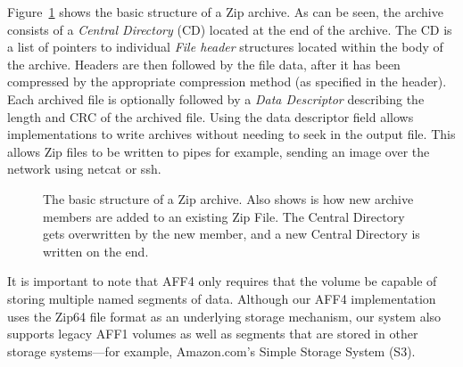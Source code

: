 \documentclass[10pt, conference]{IEEEtran}
\begin{document}
Figure~\ref{zip_structure} shows the basic structure of a Zip
archive. As can be seen, the archive consists of a {\em Central Directory} (CD)
located at the end of the archive. The CD is a list of pointers to
individual {\em File header} structures located within the body of the
archive. Headers are then followed by the file data, after it has been
compressed by the appropriate compression method (as specified in the
header). Each archived file is optionally followed by a {\em Data
Descriptor} describing the length and CRC of the archived file. Using
the data descriptor field allows implementations to write archives
without needing to seek in the output file. This allows Zip files to
be written to pipes for example, sending an image over the network
using netcat or ssh.

\begin{figure}[tbp]
  \begin{center}
  \mbox{\columnwidth {}}

  \caption{The basic structure of a Zip archive. Also shows is how new
  archive members are added to an existing Zip File. The Central
  Directory gets overwritten by the new member, and a new Central
  Directory is written on the end.  }

  \label{zip_structure}
  \end{center}
\end{figure}

It is important to note that AFF4 only requires that the volume be
capable of storing multiple named segments of data. Although our AFF4
implementation uses the Zip64 file format as an underlying storage
mechanism, our system also supports legacy AFF1 volumes as well as
segments that are stored in other storage systems---for example,
Amazon.com's Simple Storage System (S3)\cite{s3-aws-home-page-money}.
\end{document}
